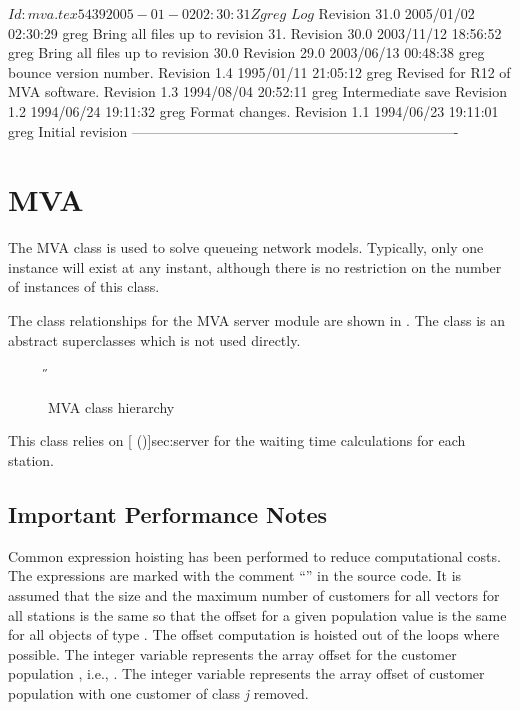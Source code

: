 \C 
\C $Id: mva.tex 5439 2005-01-02 02:30:31Z greg $
\C 
\C $Log$
\C Revision 31.0  2005/01/02 02:30:29  greg
\C Bring all files up to revision 31.
\C
\C Revision 30.0  2003/11/12 18:56:52  greg
\C Bring all files up to revision 30.0
\C
\C Revision 29.0  2003/06/13 00:48:38  greg
\C bounce version number.
\C
\C Revision 1.4  1995/01/11 21:05:12  greg
\C Revised for R12 of MVA software.
\C
\C Revision 1.3  1994/08/04  20:52:11  greg
\C Intermediate save
\C
\C Revision 1.2  1994/06/24  19:11:32  greg
\C Format changes.
\C
\C Revision 1.1  1994/06/23  19:11:01  greg
\C Initial revision
\C
\C ----------------------------------------------------------------------
\section{MVA}
\label{sec:mva}

The MVA class is used to solve queueing network models.  Typically,
only one instance will exist at any instant, although there is no
restriction on the number of instances of this class.

The class relationships for the MVA server module are shown in
.  The class  is an abstract
superclasses which is not used directly.

\begin{figure}[htbp]
  \label{fig:mva}
  \begin{center}
    \T \tex \leavevmode 
    \caption{MVA class hierarchy}
    \H {}
  \end{center}
\end{figure}

This class relies on [ (\Sec\Ref)]{sec:server} for the waiting
time calculations for each station.

\htmlrule
\subsection{Important Performance Notes}
\label{sec:mva-cautions}

Common expression hoisting has been performed to reduce computational
costs.  The expressions are marked with the comment ``''
in the source code.  It is assumed that the size and the maximum
number of customers for all 
vectors for all stations is the same so that the offset for a given
population value  is the same for all objects of type
.  The offset computation is hoisted out of the loops
where possible.  The integer variable  represents the array
offset for the customer population , i.e., .  The integer variable  represents
the array offset of customer population  with one customer of
class \emph{j} removed.  

